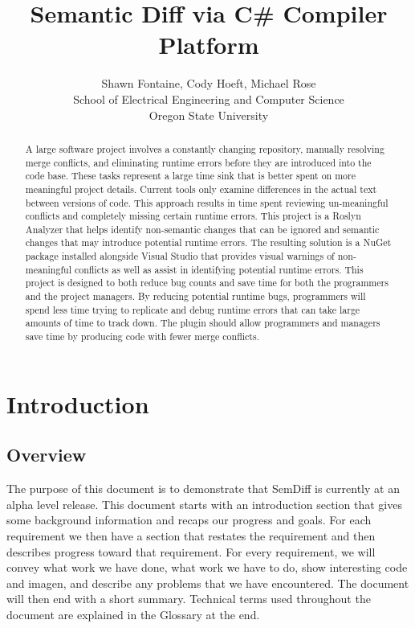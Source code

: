 \documentclass[10pt,draftclsnofoot,onecolumn]{IEEEtran}
\begin{document}
\lstset{style=cSharp}
\title{Semantic Diff via C\# Compiler Platform}

\author{Shawn Fontaine, Cody Hoeft, Michael Rose\\
	School of Electrical Engineering and Computer Science\\
	Oregon State University}

\maketitle
\thispagestyle{empty} %


\begin{abstract}
A large software project involves a constantly changing repository, manually resolving merge conflicts, and eliminating runtime errors before they are introduced into the code base. These tasks represent a large time sink that is better spent on more meaningful project details. Current tools only examine differences in the actual text between versions of code. This approach results in time spent reviewing un-meaningful conflicts and completely missing certain runtime errors. This project is a Roslyn Analyzer that helps identify non-semantic changes that can be ignored and semantic changes that may introduce potential runtime errors. The resulting solution is a NuGet package installed alongside Visual Studio that provides visual warnings of non-meaningful conflicts as well as assist in identifying potential runtime errors. This project is designed to both reduce bug counts and save time for both the programmers and the project managers. By reducing potential runtime bugs, programmers will spend less time trying to replicate and debug runtime errors that can take large amounts of time to track down. The plugin should allow programmers and managers save time by producing code with fewer merge conflicts.
\end{abstract}
\newpage
\setcounter{page}{1}

\section{Introduction}
\subsection{Overview}
The purpose of this document is to demonstrate that SemDiff is currently at an alpha level release. This document starts with an introduction section that gives some background information and recaps our progress and goals. For each requirement we then have a section that restates the requirement and then describes progress toward that requirement. For every requirement, we will convey what work we have done, what work we have to do, show interesting code and imagen, and describe any problems that we have encountered. The document will then end with a short summary. Technical terms used throughout the document are explained in the Glossary at the end.
\end{document}
